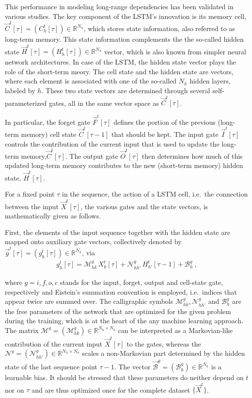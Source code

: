 \documentclass[
]{agujournal2019}
\begin{document}
This performance in modeling long-range dependencies has been validated
in various studies. The key component of the LSTM's innovation is its
memory cell, \(\vec{C}^t[\tau] = (C^t_h[\tau]) \in \mathbb{R}^{N_h}\),
which stores state information, also referred to as long-term memory.
This state information complements the the so-called hidden state
\(\vec{H}^t[\tau] = (H^t_h[\tau]) \in \mathbb{R}^{N_h}\) vector, which
is also known from simpler neural network architectures. In case of the
LSTM, the hidden state vector plays the role of the short-term meory.
The cell state and the hidden state are vectors, where each element is
associated with one of the so-called \(N_h\) hidden layers, labeled by
\(h\). These two state vectors are determined through several
self-parameterized gates, all in the same vector space as
\(\vec{C}^t[\tau]\).

In particular, the forget gate \(\vec{F}^t[\tau]\) defines the portion
of the previous (long-term memory) cell state \(\vec{C}^t[\tau-1]\) that
should be kept\hspace{0pt}. The input gate \(\vec{I}^t[\tau]\) controls
the contribution of the current input that is used to update the
long-term memory,\(\vec{C}^t[\tau]\). The output gate
\(\vec{O}^t[\tau]\) then determines how much of this updated long-term
memory contributes to the new (short-term memory) hidden state,
\(\vec{H}^t[\tau]\).

For a fixed point \(\tau\) in the sequence, the action of a LSTM cell,
i.e.~the connection between the input \(\vec{X}^t[\tau]\), the various
gates and the state vectors, is mathematically given as follows.

First, the elements of the input sequence together with the hidden state
are mapped onto auxiliary gate vectors, collectively denoted by
\(\vec{g}^t[\tau] = (g^t_h[\tau]) \in \mathbb{R}^{N_h}\), via \[
\begin{aligned}
g_h^t[\tau] =  \mathcal{M}^{g}_{hk} \, X^t_k[\tau] +  \mathcal{N}^{g}_{hh'} \, H^t_{h'}[\tau-1] + \mathcal{B}^g_{h} \ ,
\end{aligned}
\]

where \(g=i,f,o,c\) stands for the input, forget, output and cell-state
gate, respectively and Eistein's summation convention is employed,
i.e.~indices that appear twice are summed over. The calligraphic symbols
\(\mathcal{M}^{g}_{hk}, \mathcal{N}^{g}_{hh'}\) and
\(\mathcal{B}^g_{h}\) are the free parameters of the network that are
optimized for the given problem during the training, which is at the
heart of the any machine learning approach. The matrix
\(\pmb{\mathcal{M}}^{g} = (\mathcal{M}^{g}_{hk}) \in \mathbb{R}^{N_h \times N_k}\)
can be interpreted as a Markovian-like contribution of the current input
\(\vec{X}^t[\tau]\) to the gates, whereas the
\(\pmb{\mathcal{N}}^{g} = (\mathcal{N}^{g}_{hh'}) \in \mathbb{R}^{N_h \times N_h}\)
scales a non-Markovian part determined by the hidden state of the last
sequence point \(\tau-1\). The vector
\(\vec{\mathcal{B}}^g = (\mathcal{B}^g_{h}) \in \mathbb{R}^{N_h}\) is a
learnable bias. It should be stressed that these parameters do neither
depend on \(t\) nor on \(\tau\) and are thus optimized once for the
complete dataset \(\{\vec{X}^t\}\).
\end{document}
